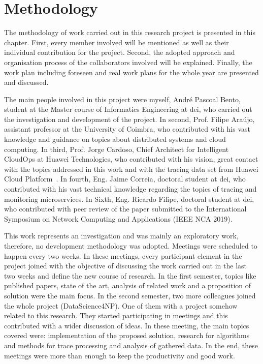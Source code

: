 \glsresetall
\chapter{Methodology}
\label{chap:methodology}

The methodology of work carried out in this research project is presented in this chapter. First, every member involved will be mentioned as well as their individual contribution for the project. Second, the adopted approach and organisation process of the collaborators involved will be explained. Finally, the work plan including foreseen and real work plans for the whole year are presented and discussed.

The main people involved in this project were myself, André Pascoal Bento, student at the Master course of Informatics Engineering at \gls{dei}, who carried out the investigation and development of the project. In second, Prof. Filipe Araújo, assistant professor at the University of Coimbra, who contributed with his vast knowledge and guidance on topics about distributed systems and cloud computing. In third, Prof. Jorge Cardoso, Chief Architect for Intelligent CloudOps at Huawei Technologies, who contributed with his vision, great contact with the topics addressed in this work and with the tracing data set from Huawei Cloud Platform~\cite{huawei_cloud_platform}. In fourth, Eng. Jaime Correia, doctoral student at \gls{dei}, who contributed with his vast technical knowledge regarding the topics of tracing and monitoring microservices. In Sixth, Eng. Ricardo Filipe, doctoral student at \gls{dei}, who contributed with peer review of the paper submitted to the International Symposium on Network Computing and Applications (IEEE NCA 2019).

This work represents an investigation and was mainly an exploratory work, therefore, no development methodology was adopted. Meetings were scheduled to happen every two weeks. In these meetings, every participant element in the project joined with the objective of discussing the work carried out in the last two weeks and define the new course of research. In the first semester, topics like published papers, state of the art, analysis of related work and a proposition of solution were the main focus. In the second semester, two more colleagues joined the whole project (DataScience4NP). One of them with a project somehow related to this research. They started participating in meetings and this contributed with a wider discussion of ideas. In these meeting, the main topics covered were: implementation of the proposed solution, research for algorithms and methods for trace processing and analysis of gathered data. In the end, these meetings were more than enough to keep the productivity and good work.

